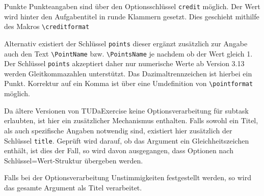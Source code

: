 \documentclass[
	ngerman,%
	accentcolor=9c,%
	points=true, für die Aktivierung der Punktereferenzen
]{tudaexercise}
\newcommand*{\code}[1]{\texttt{#1}}
\let\tbs\textbackslash
\begin{document}
\begin{task}[credit=10]{Punkte}
	Punkteangaben sind über den Optionsschlüssel \code{credit} möglich. Der Wert wird hinter den Aufgabentitel in runde Klammern gesetzt. Dies geschieht mithilfe des Makros \code{\tbs{}creditformat}

	Alternativ existiert der Schlüssel \code{points} dieser ergänzt zusätzlich zur Angabe auch den Text \code{\tbs{}PointName} bzw. \code{\tbs{PointsName}} je nachdem ob der Wert gleich 1. Der Schlüssel \code{points} akzeptiert daher nur numerische Werte ab Version 3.13 werden Gleitkommazahlen unterstützt. Das Dazimaltrennzeichen ist hierbei ein Punkt. Korrektur auf ein Komma ist über eine Umdefinition von \code{\tbs{}pointformat} möglich.

	\begin{subtask}[points=1,title={Beispiel für den Schlüssel points}]
		Da ältere Versionen von TUDaExercise keine Optionsverarbeitung für subtask erlaubten, ist hier ein zusätzlicher Mechanismus enthalten. Falls sowohl ein Titel, als auch spezifische Angaben notwendig sind, existiert hier zusätzlich der Schlüssel \code{title}.
		Geprüft wird darauf, ob das Argument ein Gleichheitszeichen enthält, ist dies der Fall, so wird davon ausgegangen, dass Optionen nach Schlüssel=Wert-Struktur übergeben werden.
	\end{subtask}

	\begin{subtask}[Fallback-Modus, falls ein = im Titel detektiert wird, aber keine Zuweisung möglich ist.]
		Falls bei der Optionsverarbeitung Unstimmigkeiten festgestellt werden, so wird das gesamte Argument als Titel verarbeitet.
	\end{subtask}
\end{task}
\end{document}
